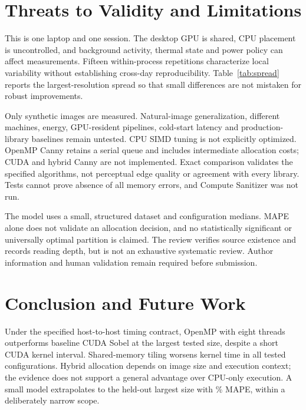 \documentclass[conference]{IEEEtran}
\begin{document}
\section{Threats to Validity and Limitations}
This is one laptop and one session. The desktop GPU is shared, CPU placement is uncontrolled, and background activity, thermal state and power policy can affect measurements. Fifteen within-process repetitions characterize local variability without establishing cross-day reproducibility. Table~\ref{tab:spread} reports the largest-resolution spread so that small differences are not mistaken for robust improvements.
\begin{table}[t]\centering\footnotesize
\caption{Largest-resolution Sobel latency variability (ms). Q1--Q3 combines image-family and timing variation.}
\label{tab:spread}\end{table}

Only synthetic images are measured. Natural-image generalization, different machines, energy, GPU-resident pipelines, cold-start latency and production-library baselines remain untested. CPU SIMD tuning is not explicitly optimized. OpenMP Canny retains a serial queue and includes intermediate allocation costs; CUDA and hybrid Canny are not implemented. Exact comparison validates the specified algorithms, not perceptual edge quality or agreement with every library. Tests cannot prove absence of all memory errors, and Compute Sanitizer was not run.

The model uses a small, structured dataset and configuration medians. MAPE alone does not validate an allocation decision, and no statistically significant or universally optimal partition is claimed. The review verifies source existence and records reading depth, but is not an exhaustive systematic review. Author information and human validation remain required before submission.

\section{Conclusion and Future Work}
Under the specified host-to-host timing contract, OpenMP with eight threads outperforms baseline CUDA Sobel at the largest tested size, despite a short CUDA kernel interval. Shared-memory tiling worsens kernel time in all tested configurations. Hybrid allocation depends on image size and execution context; the evidence does not support a general advantage over CPU-only execution. A small model extrapolates to the held-out largest size with \ModelError{}\% MAPE, within a deliberately narrow scope.
\end{document}
